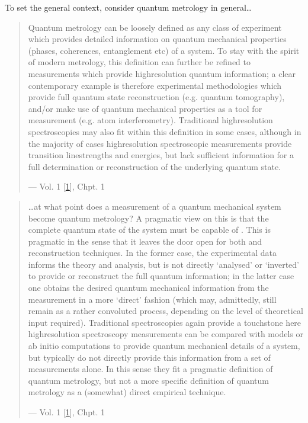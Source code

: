 \documentclass[letterpaper,table,10pt,english]{jupyterBook}
\begin{document}
\sphinxAtStartPar
To set the general context, consider quantum metrology in general…
\begin{quote}

\sphinxAtStartPar
Quantum metrology can be loosely defined as any class of experiment which provides detailed information on quantum mechanical properties (phases, coherences, entanglement etc) of a system. To stay with the spirit of modern metrology, this definition can further be refined to measurements which provide high\sphinxhyphen{}resolution quantum information; a clear contemporary example is therefore experimental methodologies which provide full quantum state reconstruction (e.g. quantum tomography), and/or make use of quantum mechanical properties as a tool for measurement (e.g. atom interferometry). Traditional high\sphinxhyphen{}resolution spectroscopies may also fit within this definition in some cases, although in the majority of cases high\sphinxhyphen{}resolution spectroscopic measurements provide transition line\sphinxhyphen{}strengths and energies, but lack sufficient information for a full determination or reconstruction of the underlying quantum state.

\begin{flushright}
--- Vol. 1 {[}\hyperlink{cite.backmatter/bibliography:id569}{1}{]}, Chpt. 1
\end{flushright}
\end{quote}
\begin{quote}

\sphinxAtStartPar
…at what point does a measurement of a quantum mechanical system become quantum metrology? A pragmatic view on this is that the complete quantum state of the system must be capable of . This is pragmatic in the sense that it leaves the door open for both  and  reconstruction techniques. In the former case, the experimental data informs the theory and analysis, but is not directly ‘analysed’ or ‘inverted’ to provide or reconstruct the full quantum information; in the latter case one obtains the desired quantum mechanical information from the measurement in a more ‘direct’ fashion (which may, admittedly, still remain as a rather convoluted process, depending on the level of theoretical input required). Traditional spectroscopies again provide a touchstone here \sphinxhyphen{} high\sphinxhyphen{}resolution spectroscopy measurements can be compared with models or ab initio computations to provide quantum mechanical details of a system, but typically do not directly provide this information from a set of measurements alone. In this sense they fit a pragmatic definition of quantum metrology, but not a more specific definition of quantum metrology as a (somewhat) direct empirical technique.

\begin{flushright}
--- Vol. 1 {[}\hyperlink{cite.backmatter/bibliography:id569}{1}{]}, Chpt. 1
\end{flushright}
\end{quote}
\end{document}
